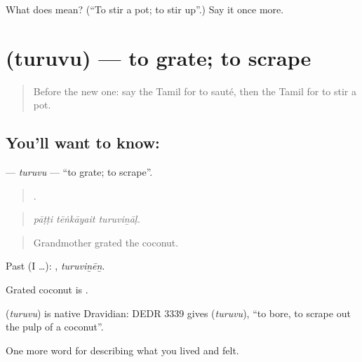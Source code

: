 \begin{tcolorbox}[breakable,colback=teal!4,colframe=teal!35!black,title={Before you move on}]
What does  mean? (\textquotedblleft{}To stir a pot; to stir up\textquotedblright{}.) Say it once more.
\end{tcolorbox}
\section[\texorpdfstring{\ta{துருவு} (turuvu)}{துருவு (turuvu)}]{ (turuvu) — to grate; to scrape}

\label{lesson:TA-C526-turuvu}



\begin{quote}
Before the new one: say the Tamil for to sauté, then the Tamil for to stir a pot.
\end{quote}

\subsection*{You'll want to know: }
\textbf{} — \emph{turuvu} — \textquotedblleft{}to grate; to scrape\textquotedblright{}.

\begin{quote}
  .
\end{quote}

\begin{quote}
\emph{pāṭṭi tēṅkāyait turuviṉāḷ.}
\end{quote}

\begin{quote}
Grandmother grated the coconut.
\end{quote}

Past (I …): , \emph{turuviṉēṉ}.

Grated coconut is  .

\begin{cousinweb}
\textbf{} (\emph{turuvu}) is native Dravidian: DEDR 3339 gives  (\emph{turuvu}), \textquotedblleft{}to bore, to scrape out the pulp of a coconut\textquotedblright{}.
\end{cousinweb}

\begin{grammarlens}[title={What you've built}]
One more word for describing what you lived and felt.
\end{grammarlens}

